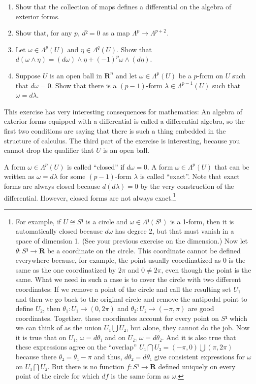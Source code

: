 \begin{exercise}
\begin{enumerate}
	\item Show that the collection of maps defines a differential on the algebra of exterior forms. 
	\item Show that, for any $p$, $d² = 0$ as a map $Λ^p→ Λ^{p+2}$. 
	\item Let $ω ∈ Λ^p(U)$ and $η ∈ Λ^q(U)$. Show that $d(ω \wedge η )= (dω) \wedge η + (-1)^p ω \wedge (dη)$. 
	\item Suppose $U$ is an open ball in $𝐑^n$ and let $ω ∈ Λ^p(U)$ be a $p$-form on $U$ such that $dω=0$. Show that there is a $(p-1)$-form $λ∈ Λ^{p-1}(U)$ such that $ω = d λ$. 
\end{enumerate}
\end{exercise}
This exercise has very interesting consequences for mathematics: An algebra of exterior  forms equipped with a differential is called a differential algebra, so the first two conditions are saying that there is such a thing embedded in the structure of calculus. The third part of the exercise is interesting, because you cannot drop the qualifier that $U$ is an open ball.  

A form $ω ∈ Λ^p(U)$ is called “closed” if $dω=0$. A form $ω ∈ Λ^p(U)$ that can be written as $ω = d λ$ for some $(p-1)$-form $λ$ is called “exact”. Note that exact forms are always closed because $d(dλ) = 0$ by the very construction of the differential. However, closed forms are not always exact.\footnote{For example, if $U≅ S¹$ is a circle and $ω∈ Λ¹(S¹)$ is a 1-form, then it is automatically closed because $dω$ has degree 2, but that must vanish in a space of dimension 1. (See your previous exercise on the dimension.) Now let $θ: S¹ → 𝐑$ be a coordinate on the circle. This coordinate cannot be defined everywhere because, for example, the point usually coordinatized as $0$ is the same as the one coordinatized by $2π$ and $0 ≠ 2π$, even though the point is the same. What we need in such a case is to cover the circle with two different coordinates: If we remove a point of the circle and call the resulting set $U₁$ and then we go back to the original circle and remove the antipodal point to define $U₂$, then $θ₁ : U₁ → (0,2π)$ and $θ₂ : U₂ → (-π , π)$ are good coordinates. Together, these coordinates account for every point on $S¹$ which we can think of as the union $U₁ ⋃ U₂$, but alone, they cannot do the job. Now it is true that on $U₁$, $ω = d θ₁$ and on $U₂$, $ω = d θ₂$. And it is also true that these expressions agree on the “overlap” $U₁ ⋂ U₂ = (-π, 0) ⋃ (π, 2 π)$ because there $θ₂ = θ₁ - π$ and thus, $d θ₂  = d θ₁$ give consistent expressions for $ω$ on $U₁ ⋂ U₂$. But there is no function $f:S¹ → 𝐑$ defined uniquely on every point of the circle for which $df$ is the same form as $ω$.}

